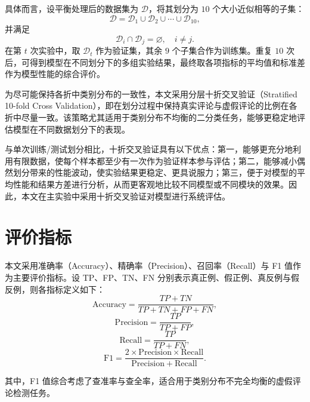 \documentclass[UTF8,oneside,openright,fontset=none]{ctexbook}
\numberwithin{equation}{chapter}
\begin{document}
具体而言，设平衡处理后的数据集为 $\mathcal{D}$，将其划分为 $10$ 个大小近似相等的子集：
\begin{equation}
  \mathcal{D}=\mathcal{D}_1\cup \mathcal{D}_2\cup \cdots \cup \mathcal{D}_{10},
\end{equation}
并满足
\begin{equation}
  \mathcal{D}_i \cap \mathcal{D}_j = \varnothing,\quad i\neq j.
\end{equation}
在第 $t$ 次实验中，取 $\mathcal{D}_t$ 作为验证集，其余 $9$ 个子集合作为训练集。重复 $10$ 次后，可得到模型在不同划分下的多组实验结果，最终取各项指标的平均值和标准差作为模型性能的综合评价。

为尽可能保持各折中类别分布的一致性，本文采用分层十折交叉验证（Stratified 10-fold Cross Validation），即在划分过程中保持真实评论与虚假评论的比例在各折中尽量一致。该策略尤其适用于类别分布不均衡的二分类任务，能够更稳定地评估模型在不同数据划分下的表现。

与单次训练/测试划分相比，十折交叉验证具有以下优点：第一，能够更充分地利用有限数据，使每个样本都至少有一次作为验证样本参与评估；第二，能够减小偶然划分带来的性能波动，使实验结果更稳定、更具说服力；第三，便于对模型的平均性能和结果方差进行分析，从而更客观地比较不同模型或不同模块的效果。因此，本文在主实验中采用十折交叉验证对模型进行系统评估。

\section{评价指标}
本文采用准确率（Accuracy）、精确率（Precision）、召回率（Recall）与 F1 值作为主要评价指标。设 TP、FP、TN、FN 分别表示真正例、假正例、真反例与假反例，则各指标定义如下：
\begin{equation}
  \mathrm{Accuracy} = \frac{TP + TN}{TP + TN + FP + FN},
\end{equation}
\begin{equation}
  \mathrm{Precision} = \frac{TP}{TP + FP},
\end{equation}
\begin{equation}
  \mathrm{Recall} = \frac{TP}{TP + FN},
\end{equation}
\begin{equation}
  \mathrm{F1} = \frac{2\times \mathrm{Precision}\times \mathrm{Recall}}{\mathrm{Precision}+\mathrm{Recall}}.
\end{equation}

其中，F1 值综合考虑了查准率与查全率，适合用于类别分布不完全均衡的虚假评论检测任务。

\end{document}
